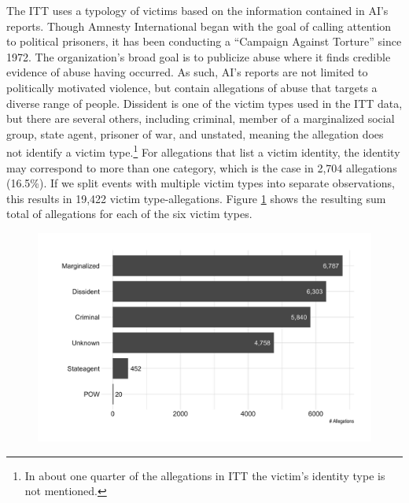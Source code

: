 \documentclass[11pt]{article}
\begin{document}
The ITT uses a typology of victims based on the information contained in AI's reports. Though Amnesty International began with the goal of calling attention to political prisoners, it has been conducting a ``Campaign Against Torture'' since 1972. The organization's broad goal is to publicize abuse where it finds credible evidence of abuse having occurred. As such, AI's reports are not limited to politically motivated violence, but contain allegations of abuse that targets a diverse range of people. Dissident is one of the victim types used in the ITT data, but there are several others, including criminal, member of a marginalized social group, state agent, prisoner of war, and unstated, meaning the allegation does not identify a victim type.\footnote{In about one quarter of the allegations in ITT the victim's identity type is not mentioned.} For allegations that list a victim identity, the identity may correspond to more than one category, which is the case in 2,704 allegations (16.5\%). If we split events with multiple victim types into separate observations, this results in 19,422 victim type-allegations. Figure \ref{fig:victim-types} shows the resulting sum total of allegations for each of the six victim types. 
\begin{figure}
\begin{center}
\caption{}
\label{fig:victim-types}
\includegraphics[width=.75\textwidth]{../output/figures/allegations-by-victim.png}
\end{center}
\end{figure}
\end{document}

